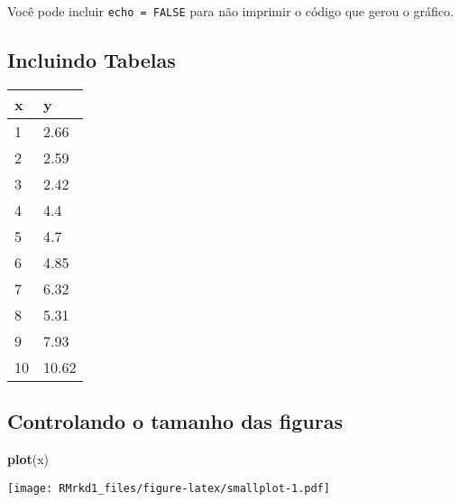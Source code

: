 \documentclass[]{article}
\newenvironment{Shaded}{\begin{snugshade}}{\end{snugshade}}
\newcommand{\KeywordTok}[1]{\textcolor[rgb]{0.13,0.29,0.53}{\textbf{#1}}}
\newcommand{\NormalTok}[1]{#1}
\begin{document}
Você pode incluir \texttt{echo\ =\ FALSE} para não imprimir o código que
gerou o gráfico.

\subsection{Incluindo Tabelas}\label{incluindo-tabelas}

\begin{longtable}[]{@{}ll@{}}
\toprule
x & y\tabularnewline
\midrule
\endhead
1 & 2.66\tabularnewline
2 & 2.59\tabularnewline
3 & 2.42\tabularnewline
4 & 4.4\tabularnewline
5 & 4.7\tabularnewline
6 & 4.85\tabularnewline
7 & 6.32\tabularnewline
8 & 5.31\tabularnewline
9 & 7.93\tabularnewline
10 & 10.62\tabularnewline
\bottomrule
\end{longtable}

\subsection{Controlando o tamanho das
figuras}\label{controlando-o-tamanho-das-figuras}

\begin{Shaded}
\begin{Highlighting}[]
\KeywordTok{plot}\NormalTok{(x)}
\end{Highlighting}
\end{Shaded}

\texttt{[image: RMrkd1\_files/figure-latex/smallplot-1.pdf]}
\end{document}
